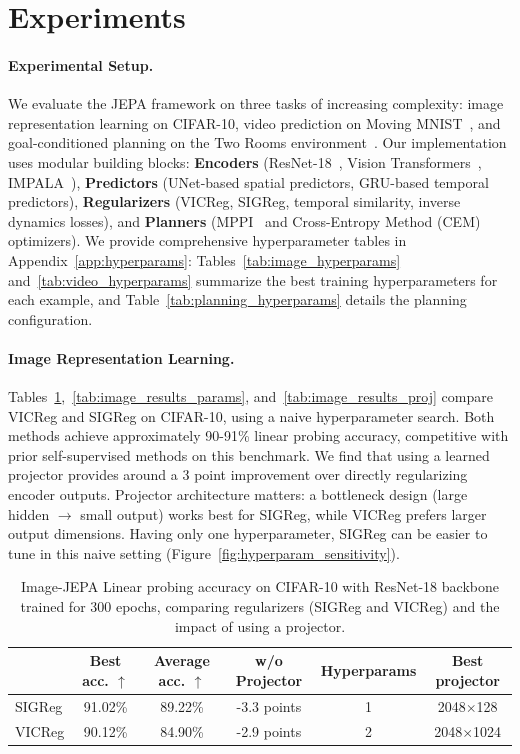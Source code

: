 \documentclass{article}
\begin{document}
\section{Experiments}

\paragraph{Experimental Setup.}
We evaluate the JEPA framework on three tasks of increasing complexity: image representation learning on CIFAR-10, video prediction on Moving MNIST~\citep{moving_mnist}, and goal-conditioned planning on the Two Rooms environment~\citep{PLDM}.
Our implementation uses modular building blocks:
\textbf{Encoders} (ResNet-18~\citep{ResNet}, Vision Transformers~\citep{VITs}, IMPALA~\citep{Impala}),
\textbf{Predictors} (UNet-based spatial predictors, GRU-based temporal predictors),
\textbf{Regularizers} (VICReg, SIGReg, temporal similarity, inverse dynamics losses), and
\textbf{Planners} (MPPI~\citep{MPPI} and Cross-Entropy Method (CEM) optimizers).
We provide comprehensive hyperparameter tables in Appendix~\ref{app:hyperparams}: Tables~\ref{tab:image_hyperparams} and~\ref{tab:video_hyperparams} summarize the best training hyperparameters for each example, and Table~\ref{tab:planning_hyperparams} details the planning configuration.


\paragraph{Image Representation Learning.} Tables~\ref{tab:image_results},~\ref{tab:image_results_params}, and~\ref{tab:image_results_proj} compare VICReg and SIGReg on CIFAR-10, using a naive hyperparameter search.
Both methods achieve approximately 90-91\% linear probing accuracy, competitive with prior self-supervised methods on this benchmark.
We find that using a learned projector provides around a 3 point improvement over directly regularizing encoder outputs. Projector architecture matters: a bottleneck design (large hidden $\rightarrow$ small output) works best for SIGReg, while VICReg prefers larger output dimensions. Having only one hyperparameter, SIGReg can be easier to tune in this naive setting (Figure~\ref{fig:hyperparam_sensitivity}).

\begin{table}[t]
\caption{Image-JEPA Linear probing accuracy on CIFAR-10 with ResNet-18 backbone trained for 300 epochs, comparing regularizers (SIGReg and VICReg) and the impact of using a projector.}
\label{tab:image_results}
\centering
\begin{tabular}{lccccc}
\toprule
          & Best acc. $\uparrow$ & Average acc. $\uparrow$ & w/o Projector & Hyperparams & Best projector \\
\midrule
SIGReg    & 91.02\%       & 89.22\%                           & -3.3 points       & 1               & 2048$\times$128     \\
VICReg    & 90.12\%       & 84.90\%                           & -2.9 points       & 2               & 2048$\times$1024    \\
\bottomrule
\end{tabular}
\end{table}
\end{document}
